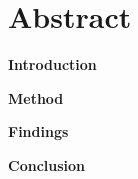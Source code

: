 \chapter{Abstract}

\textbf{Introduction}

\textbf{Method}

\textbf{Findings}

\textbf{Conclusion}





















